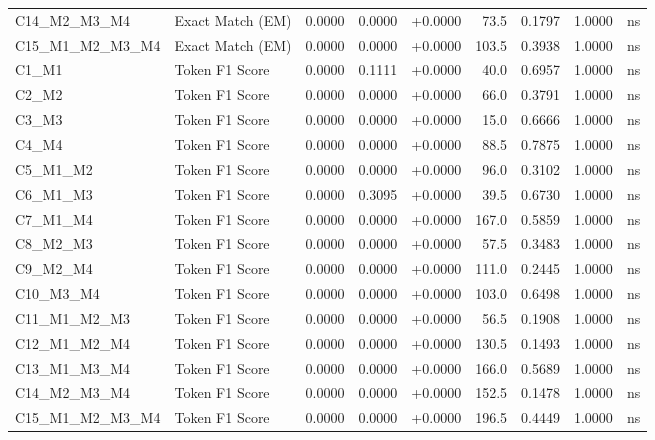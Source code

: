 \begin{table}[p]
\begin{tabular*}{\textwidth}{@{\extracolsep{\fill}} l l r r r r r r c @{}}
\addlinespace
C14\_M2\_M3\_M4 & Exact Match (EM)     & 0.0000 & 0.0000 & +0.0000 & 73.5 & 0.1797 & 1.0000 & ns \\
\addlinespace
C15\_M1\_M2\_M3\_M4 & Exact Match (EM)     & 0.0000 & 0.0000 & +0.0000 & 103.5 & 0.3938 & 1.0000 & ns \\
\addlinespace
C1\_M1          & Token F1 Score       & 0.0000 & 0.1111 & +0.0000 & 40.0 & 0.6957 & 1.0000 & ns \\
\addlinespace
C2\_M2          & Token F1 Score       & 0.0000 & 0.0000 & +0.0000 & 66.0 & 0.3791 & 1.0000 & ns \\
\addlinespace
C3\_M3          & Token F1 Score       & 0.0000 & 0.0000 & +0.0000 & 15.0 & 0.6666 & 1.0000 & ns \\
\addlinespace
C4\_M4          & Token F1 Score       & 0.0000 & 0.0000 & +0.0000 & 88.5 & 0.7875 & 1.0000 & ns \\
\addlinespace
C5\_M1\_M2      & Token F1 Score       & 0.0000 & 0.0000 & +0.0000 & 96.0 & 0.3102 & 1.0000 & ns \\
\addlinespace
C6\_M1\_M3      & Token F1 Score       & 0.0000 & 0.3095 & +0.0000 & 39.5 & 0.6730 & 1.0000 & ns \\
\addlinespace
C7\_M1\_M4      & Token F1 Score       & 0.0000 & 0.0000 & +0.0000 & 167.0 & 0.5859 & 1.0000 & ns \\
\addlinespace
C8\_M2\_M3      & Token F1 Score       & 0.0000 & 0.0000 & +0.0000 & 57.5 & 0.3483 & 1.0000 & ns \\
\addlinespace
C9\_M2\_M4      & Token F1 Score       & 0.0000 & 0.0000 & +0.0000 & 111.0 & 0.2445 & 1.0000 & ns \\
\addlinespace
C10\_M3\_M4     & Token F1 Score       & 0.0000 & 0.0000 & +0.0000 & 103.0 & 0.6498 & 1.0000 & ns \\
\addlinespace
C11\_M1\_M2\_M3 & Token F1 Score       & 0.0000 & 0.0000 & +0.0000 & 56.5 & 0.1908 & 1.0000 & ns \\
\addlinespace
C12\_M1\_M2\_M4 & Token F1 Score       & 0.0000 & 0.0000 & +0.0000 & 130.5 & 0.1493 & 1.0000 & ns \\
\addlinespace
C13\_M1\_M3\_M4 & Token F1 Score       & 0.0000 & 0.0000 & +0.0000 & 166.0 & 0.5689 & 1.0000 & ns \\
\addlinespace
C14\_M2\_M3\_M4 & Token F1 Score       & 0.0000 & 0.0000 & +0.0000 & 152.5 & 0.1478 & 1.0000 & ns \\
\addlinespace
C15\_M1\_M2\_M3\_M4 & Token F1 Score       & 0.0000 & 0.0000 & +0.0000 & 196.5 & 0.4449 & 1.0000 & ns \\

\end{tabular*}
\end{table}
